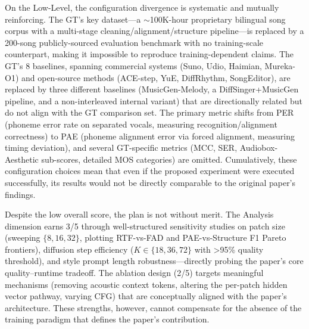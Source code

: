 On the Low-Level, the configuration divergence is systematic and mutually reinforcing. The GT's key dataset---a $\sim$100K-hour proprietary bilingual song corpus with a multi-stage cleaning/alignment/structure pipeline---is replaced by a 200-song publicly-sourced evaluation benchmark with no training-scale counterpart, making it impossible to reproduce training-dependent claims. The GT's 8 baselines, spanning commercial systems (Suno, Udio, Haimian, Mureka-O1) and open-source methods (ACE-step, YuE, DiffRhythm, SongEditor), are replaced by three different baselines (MusicGen-Melody, a DiffSinger+MusicGen pipeline, and a non-interleaved internal variant) that are directionally related but do not align with the GT comparison set. The primary metric shifts from PER (phoneme error rate on separated vocals, measuring recognition/alignment correctness) to PAE (phoneme alignment error via forced alignment, measuring timing deviation), and several GT-specific metrics (MCC, SER, Audiobox-Aesthetic sub-scores, detailed MOS categories) are omitted. Cumulatively, these configuration choices mean that even if the proposed experiment were executed successfully, its results would not be directly comparable to the original paper's findings.

Despite the low overall score, the plan is not without merit. The Analysis dimension earns 3/5 through well-structured sensitivity studies on patch size (sweeping $\{8,16,32\}$, plotting RTF-vs-FAD and PAE-vs-Structure F1 Pareto frontiers), diffusion step efficiency ($K\in\{18,36,72\}$ with >95\% quality threshold), and style prompt length robustness---directly probing the paper's core quality--runtime tradeoff. The ablation design (2/5) targets meaningful mechanisms (removing acoustic context tokens, altering the per-patch hidden vector pathway, varying CFG) that are conceptually aligned with the paper's architecture. These strengths, however, cannot compensate for the absence of the training paradigm that defines the paper's contribution.

